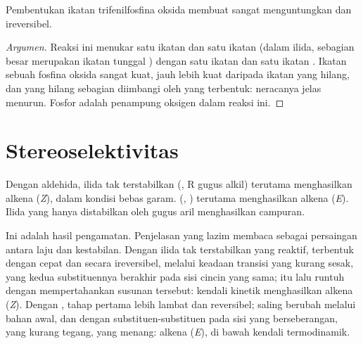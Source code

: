 \begin{proposition}\label{prop:b2:wittig:driving}
Pembentukan ikatan  trifenilfosfina oksida membuat 
sangat menguntungkan dan ireversibel.
\end{proposition}

\begin{proof}[Argumen]
Reaksi ini menukar satu ikatan  dan satu ikatan  (dalam
ilida,  sebagian besar merupakan ikatan tunggal
) dengan satu ikatan  dan satu ikatan . Ikatan
 sebuah fosfina oksida sangat kuat, jauh lebih kuat daripada ikatan
 yang hilang, dan  yang hilang sebagian diimbangi oleh
 yang terbentuk: neracanya jelas menurun. Fosfor adalah penampung
oksigen dalam reaksi ini.
\end{proof}

\section{Stereoselektivitas}

\begin{proposition}\label{prop:b2:wittig:stereo}
Dengan aldehida, ilida tak terstabilkan (, R gugus alkil)
terutama menghasilkan alkena (\textit{Z}),
dalam kondisi bebas garam.  (, )
terutama menghasilkan alkena
(\textit{E}). Ilida yang hanya distabilkan oleh gugus aril menghasilkan campuran.
\end{proposition}

\admitted

Ini adalah hasil pengamatan. Penjelasan yang lazim membaca 
sebagai persaingan antara laju dan kestabilan. Dengan ilida tak
terstabilkan yang reaktif,  terbentuk dengan cepat dan secara
ireversibel, melalui keadaan transisi yang kurang sesak, yang kedua
substituennya berakhir pada sisi cincin yang sama;  itu lalu
runtuh dengan mempertahankan susunan tersebut: kendali kinetik menghasilkan
alkena (\textit{Z}). Dengan , tahap pertama lebih lambat
dan reversibel;  saling berubah melalui bahan
awal, dan  dengan substituen-substituen pada sisi yang
berseberangan, yang kurang tegang, yang menang: alkena (\textit{E}), di
bawah kendali termodinamik.

